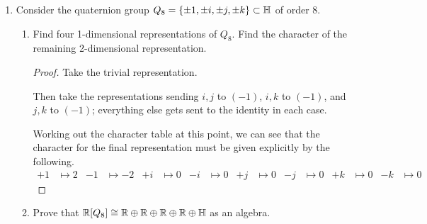 \documentclass[../psets.tex]{subfiles}
\begin{document}
\begin{enumerate}
\begin{enumerate}
\begin{proof}
            We have that $f$ commutes with scalar multiplication because
            \begin{equation*}
                f(B(As)) = f[(BA)s]
                = (BA)e_1
                = B(Ae_1)
                = Bf(As)
            \end{equation*}
            Thus, $f$ is a module homomorphism. Additionally, since $\ker(f)$ is a submodule of $S$, $S$ is simple, and $f$ is nontrivial, we have that $\ker(f)=0$ and hence $f$ is injective. Similarly, since $\im(f)$ is a submodule of $F^n$, $F^n$ is simple, and $f$ is nontrivial, we have that $\im(f)=F^n$ and hence $f$ is surjective. Thus, as an injective, surjective module homomorphism, $f$ is a module \emph{isomorphism} as well. Therefore, $S\cong F^n$, as desired.
        \end{proof}
    \end{enumerate}
    \item Consider the quaternion group $Q_8=\{\pm 1,\pm i,\pm j,\pm k\}\subset\mathbb{H}$ of order 8.
    \begin{enumerate}
        \item Find four 1-dimensional representations of $Q_8$. Find the character of the remaining 2-dimensional representation.
        \begin{proof}
            Take the trivial representation.\par
            Then take the representations sending $i,j$ to $(-1)$, $i,k$ to $(-1)$, and $j,k$ to $(-1)$; everything else gets sent to the identity in each case.\par
            Working out the character table at this point, we can see that the character for the final representation must be given explicitly by the following.
            \begin{align*}
                +1 &\mapsto 2&
                -1 &\mapsto -2&
                +i &\mapsto 0&
                -i &\mapsto 0&
                +j &\mapsto 0&
                -j &\mapsto 0&
                +k &\mapsto 0&
                -k &\mapsto 0
            \end{align*}
        \end{proof}
        \item Prove that $\mathbb{R}[Q_8]\cong\mathbb{R}\oplus\mathbb{R}\oplus\mathbb{R}\oplus\mathbb{R}\oplus\mathbb{H}$ as an algebra.
    \end{enumerate}
\end{enumerate}
\end{document}
